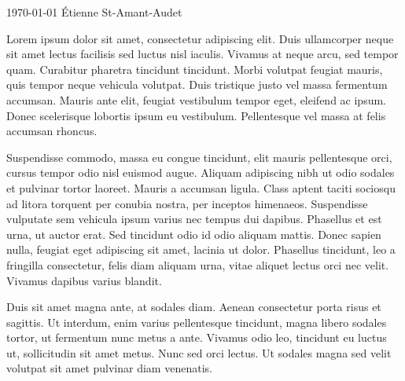 \documentclass[11pt, a4paper]{awesome-cv}
\begin{document}
\makecvheader[R]

\makecvfooter
  {\today}
  {Étienne St-Amant-Audet}
  {}

\makelettertitle

\begin{cvletter}

Lorem ipsum dolor sit amet, consectetur adipiscing elit. Duis ullamcorper neque sit amet lectus facilisis sed luctus nisl iaculis. Vivamus at neque arcu, sed tempor quam. Curabitur pharetra tincidunt tincidunt. Morbi volutpat feugiat mauris, quis tempor neque vehicula volutpat. Duis tristique justo vel massa fermentum accumsan. Mauris ante elit, feugiat vestibulum tempor eget, eleifend ac ipsum. Donec scelerisque lobortis ipsum eu vestibulum. Pellentesque vel massa at felis accumsan rhoncus.

Suspendisse commodo, massa eu congue tincidunt, elit mauris pellentesque orci, cursus tempor odio nisl euismod augue. Aliquam adipiscing nibh ut odio sodales et pulvinar tortor laoreet. Mauris a accumsan ligula. Class aptent taciti sociosqu ad litora torquent per conubia nostra, per inceptos himenaeos. Suspendisse vulputate sem vehicula ipsum varius nec tempus dui dapibus. Phasellus et est urna, ut auctor erat. Sed tincidunt odio id odio aliquam mattis. Donec sapien nulla, feugiat eget adipiscing sit amet, lacinia ut dolor. Phasellus tincidunt, leo a fringilla consectetur, felis diam aliquam urna, vitae aliquet lectus orci nec velit. Vivamus dapibus varius blandit.

Duis sit amet magna ante, at sodales diam. Aenean consectetur porta risus et sagittis. Ut interdum, enim varius pellentesque tincidunt, magna libero sodales tortor, ut fermentum nunc metus a ante. Vivamus odio leo, tincidunt eu luctus ut, sollicitudin sit amet metus. Nunc sed orci lectus. Ut sodales magna sed velit volutpat sit amet pulvinar diam venenatis.

\end{cvletter}


\makeletterclosing
\end{document}
